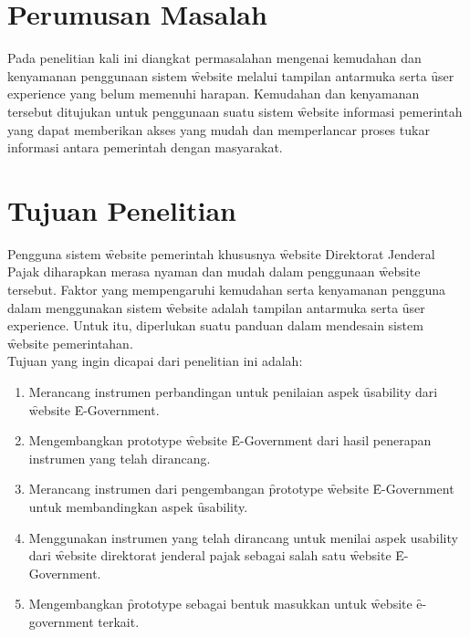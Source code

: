 \section{Perumusan Masalah}
Pada penelitian kali ini diangkat permasalahan mengenai kemudahan dan kenyamanan penggunaan sistem \f{website} melalui tampilan antarmuka serta \f{user experience} yang belum memenuhi harapan. Kemudahan dan kenyamanan tersebut ditujukan untuk penggunaan suatu sistem \f{website} informasi pemerintah yang dapat memberikan akses yang mudah dan memperlancar proses tukar informasi antara pemerintah dengan masyarakat.

\section{Tujuan Penelitian}
Pengguna sistem \f{website} pemerintah khususnya \f{website} Direktorat Jenderal Pajak diharapkan merasa nyaman dan mudah dalam penggunaan \f{website} tersebut. Faktor yang mempengaruhi kemudahan serta kenyamanan pengguna dalam menggunakan sistem \f{website} adalah tampilan antarmuka serta \f{user experience}. Untuk itu, diperlukan suatu panduan dalam mendesain sistem \f{website} pemerintahan.
\newline\\
Tujuan yang ingin dicapai dari penelitian ini adalah:
\begin{enumerate}
\item Merancang instrumen perbandingan untuk penilaian aspek \f{usability} dari \f{website} \f{E-Government}.
\item Mengembangkan prototype \f{website} \f{E-Government} dari hasil penerapan instrumen yang telah dirancang.
\item Merancang instrumen dari pengembangan \f{prototype} \f{website} \f{E-Government} untuk membandingkan aspek \f{usability}.
\item Menggunakan instrumen yang telah dirancang untuk menilai aspek usability dari \f{website} direktorat jenderal pajak sebagai salah satu \f{website} \f{E-Government}.
\item Mengembangkan \f{prototype} sebagai bentuk masukkan untuk \f{website} \f{e-government} terkait.
\end{enumerate}
